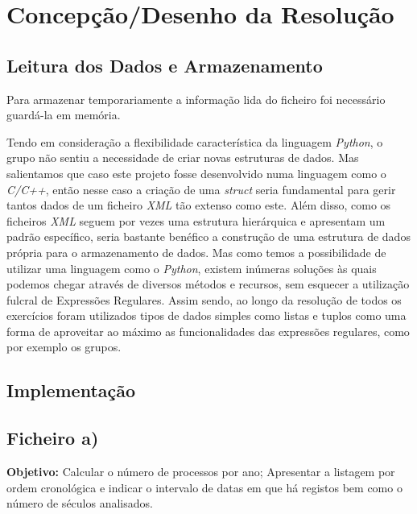 \documentclass[11pt,a4paper]{report}
\begin{document}
\chapter{Concepção/Desenho da Resolução}			%


\section{Leitura dos Dados e Armazenamento}

	\qquad Para armazenar temporariamente a informação lida do ficheiro foi necessário guardá-la em memória.\par 
	\qquad Tendo em consideração a flexibilidade característica da linguagem \textit{Python}, o grupo não sentiu a necessidade de criar novas estruturas de dados. Mas salientamos que caso este projeto fosse desenvolvido numa linguagem como o \textit{C/C++}, então nesse caso a criação de uma \textit{struct} seria fundamental para gerir tantos dados de um ficheiro \textit{XML} tão extenso como este. Além disso, como os ficheiros \textit{XML} seguem por vezes uma estrutura hierárquica e apresentam um padrão específico, seria bastante benéfico a construção de uma estrutura de dados própria para o armazenamento de dados. Mas como temos a possibilidade de utilizar uma linguagem como o \textit{Python}, existem inúmeras soluções às quais podemos chegar através de diversos métodos e recursos, sem esquecer a utilização fulcral de Expressões Regulares. Assim sendo, ao longo da resolução de todos os exercícios foram utilizados tipos de dados simples como listas e tuplos como uma forma de aproveitar ao máximo as funcionalidades das expressões regulares, como por exemplo os grupos.
	



\section{Implementação}

	\section*{Ficheiro a)}

	\textbf{Objetivo:} Calcular o número de processos por ano; Apresentar a listagem por ordem cronológica e indicar o
intervalo de datas em que há registos bem como o número de séculos analisados.
\vspace{0.5cm}
\end{document}
